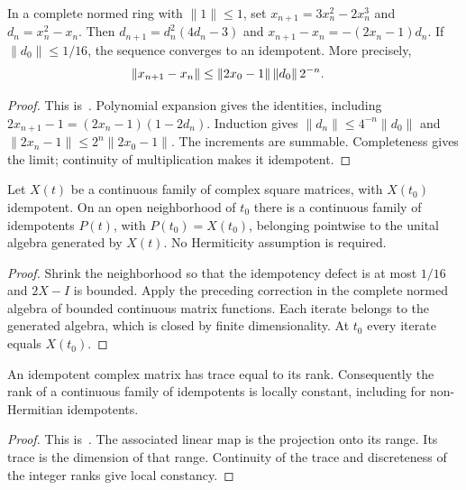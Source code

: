\begin{lemma}
    \label{thm:spt_newton_idempotent}
    \leanok
    In a complete normed ring with $\|1\|\le1$, set
    $x_{n+1}=3x_n^2-2x_n^3$ and $d_n=x_n^2-x_n$.
    Then $d_{n+1}=d_n^2(4d_n-3)$ and
    $x_{n+1}-x_n=-(2x_n-1)d_n$.
    If $\|d_0\|\le1/16$, the sequence converges to an idempotent.
    More precisely,
    \begin{align}
        \|x_{n+1}-x_n\| & \le
        \|2x_0-1\|\,\|d_0\|\,2^{-n}.
        \notag
    \end{align}
\end{lemma}
\begin{proof}\leanok
    This is~\cite[``Polynomial correction of an
        idempotent'']{QICLean2026Blueprint}.
    Polynomial expansion gives the identities, including
    $2x_{n+1}-1=(2x_n-1)(1-2d_n)$.
    Induction gives $\|d_n\|\le4^{-n}\|d_0\|$ and
    $\|2x_n-1\|\le2^n\|2x_0-1\|$. The increments are summable.
    Completeness gives the limit; continuity of multiplication makes it
    idempotent.
\end{proof}

\begin{lemma}
    \label{thm:spt_continuous_nearby_idempotent}
    \leanok
    Let $X(t)$ be a continuous family of complex square matrices,
    with $X(t_0)$ idempotent. On an open neighborhood of $t_0$ there is
    a continuous family of idempotents $P(t)$, with $P(t_0)=X(t_0)$,
    belonging pointwise to the unital algebra generated by $X(t)$.
    No Hermiticity assumption is required.
\end{lemma}
\begin{proof}\leanok
    Shrink the neighborhood so that the idempotency defect is at most
    $1/16$ and $2X-I$ is bounded. Apply the preceding correction in the
    complete normed algebra of bounded continuous matrix functions.
    Each iterate belongs to the generated algebra, which is closed
    by finite dimensionality. At $t_0$ every iterate equals $X(t_0)$.
\end{proof}

\begin{lemma}
    \label{thm:spt_idempotent_rank}
    \leanok
    An idempotent complex matrix has trace equal to its rank.
    Consequently the rank of a continuous family of idempotents is
    locally constant, including for non-Hermitian idempotents.
\end{lemma}
\begin{proof}\leanok
    This is~\cite[``Rank of an idempotent'']{QICLean2026Blueprint}.
    The associated linear map is the projection onto its range.
    Its trace is the dimension of that range. Continuity of the trace
    and discreteness of the integer ranks give local constancy.
\end{proof}

